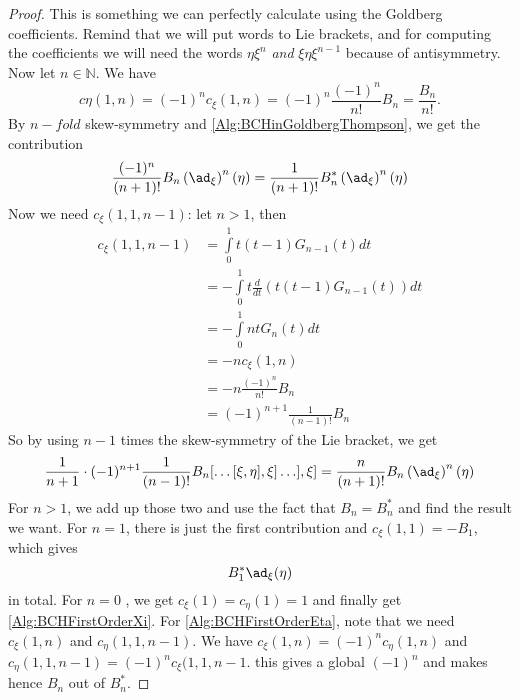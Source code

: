 \begin{proof}
	This is something we can perfectly calculate using the Goldberg 
	coefficients. Remind that we will put words to Lie brackets, and for 
	computing the coefficients we will need the words $\eta \xi^n$ \emph{and} 
	$\xi \eta \xi^{n-1}$ because of antisymmetry. Now let $n \in \mathbb{N}$. 
	We have
	\begin{equation*}
		c{\eta}(1,n) 
		= 
		(-1)^n c_{\xi}(1,n) 
		= 
		(-1)^n 
		\frac{(-1)^n}{n!} 
		B_n 
		= 
		\frac{B_n}{n!}.
	\end{equation*}
	By $n-fold$ skew-symmetry and \eqref{Alg:BCHinGoldbergThompson}, we get 
	the contribution
	\begin{equation*}
		\frac{(-1)^n}{(n+1)!} 
		B_n \left( \ad_{\xi} \right)^n (\eta)
		=
		\frac{1}{(n+1)!} 
		B_n^* \left( \ad_{\xi} \right)^n (\eta)		
	\end{equation*}
	Now we need $c_{\xi}(1, 1, n-1)$: let $n > 1$, then
	\begin{align*}
		c_{\xi}(1, 1, n - 1) 
		& = 
		\int\limits_0^1 
		t(t-1) G_{n-1}(t) 
		dt 
		\\
		& = 
		- \int\limits_0^1 
		t \frac{d}{dt} 
		\left( t(t-1) G_{n-1}(t) \right) 
		dt 
		\\
		& =
		- \int\limits_0^1 
		n t G_n(t) 
		dt 
		\\
		& = 
		-n 
		c_{\xi}(1,n) 
		\\
		& = 
		-n 
		\frac{(-1)^n}{n!} 
		B_n 
		\\
		& =  
		(-1)^{n + 1} 
		\frac{1}{(n-1)!} B_n
	\end{align*}
	So by using $n-1$ times the skew-symmetry of the Lie bracket, we get
	\begin{equation*}
		\frac{1}{n + 1} 
		\cdot (-1)^{n + 1} 
		\frac{1}{ (n - 1)! }
		B_n 
		[\ldots [\xi, \eta], \xi] \ldots ], \xi] 
		= 
		\frac{n}{(n+1)!} 
		B_n 
		\left( \ad_{\xi} \right)^n (\eta)
	\end{equation*}
	For $n > 1$, we add up those two and use the fact that $B_n = B_n^*$ and 
	find the result we want. For $n = 1$, there is just the first contribution 
	and $c_{\xi}(1,1) = - B_1$, which gives
	\begin{equation*}
		B_1^* \ad_{\xi}(\eta)
	\end{equation*}
	in total. For $n = 0$ , we get $c_{\xi}(1) = c_{\eta}(1) = 1$ and finally 
	get \eqref{Alg:BCHFirstOrderXi}. For \eqref{Alg:BCHFirstOrderEta}, note 
	that we need $c_{\xi}(1, n)$ and $c_{\eta}(1, 1, n-1)$. We have 
	$c_{\xi}(1,n) = (-1)^n c_{\eta}(1,n)$ and 
	$c_{\eta}(1, 1, n-1) = (-1)^n c_{\xi}(1,1,n-1$.
	this gives a global $(-1)^n$ and makes hence $B_n$ out of $B_n^*$.
\end{proof}
